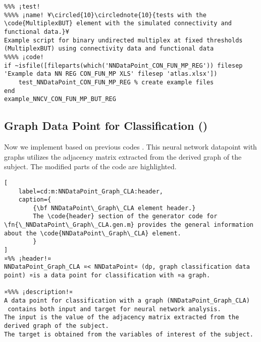 \documentclass{tufte-handout}
\begin{document}
\begin{lstlisting}
%%% ¡test!
%%%% ¡name! ¥\circled{10}\circlednote{10}{tests with the \code{MultiplexBUT} element with the simulated connectivity and functional data.}¥
Example script for binary undirected multiplex at fixed thresholds (MultiplexBUT) using connectivity data and functional data
%%%% ¡code!
if ~isfile([fileparts(which('NNDataPoint_CON_FUN_MP_REG')) filesep 'Example data NN REG CON_FUN_MP XLS' filesep 'atlas.xlsx'])
    test_NNDataPoint_CON_FUN_MP_REG % create example files
end
example_NNCV_CON_FUN_MP_BUT_REG

\end{lstlisting}

\clearpage
\subsection{Graph Data Point for Classification ()}

Now we implement  based on previous codes .
This neural network datapoint with graphs utilizes the adjacency matrix extracted from the derived graph of the subject. 
The modified parts of the code are highlighted.

\begin{lstlisting}[
	label=cd:m:NNDataPoint_Graph_CLA:header,
	caption={
		{\bf NNDataPoint\_Graph\_CLA element header.}
		The \code{header} section of the generator code for \fn{\_NNDataPoint\_Graph\_CLA.gen.m} provides the general information about the \code{NNDataPoint\_Graph\_CLA} element.
		}
]
¤%% ¡header!¤
NNDataPoint_Graph_CLA ¤< NNDataPoint¤ (dp, graph classification data point) ¤is a data point for classification with ¤a graph.

¤%%% ¡description!¤
A data point for classification with a graph (NNDataPoint_Graph_CLA) 
 contains both input and target for neural network analysis.
The input is the value of the adjacency matrix extracted from the derived graph of the subject.
The target is obtained from the variables of interest of the subject.
\end{lstlisting}
\end{document}
